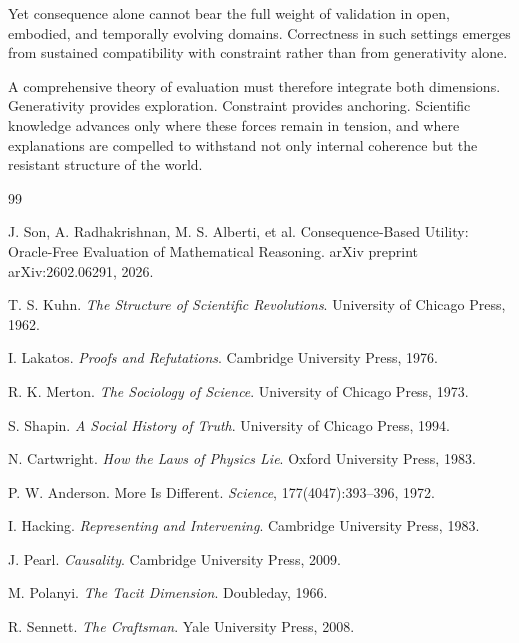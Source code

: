 \documentclass[12pt]{article}
\begin{document}
Yet consequence alone cannot bear the full weight of validation in open, embodied, and temporally evolving domains. Correctness in such settings emerges from sustained compatibility with constraint rather than from generativity alone.

A comprehensive theory of evaluation must therefore integrate both dimensions. Generativity provides exploration. Constraint provides anchoring. Scientific knowledge advances only where these forces remain in tension, and where explanations are compelled to withstand not only internal coherence but the resistant structure of the world.

\newpage
\begin{thebibliography}{99}

J. Son, A. Radhakrishnan, M. S. Alberti, et al.
\newblock Consequence-Based Utility: Oracle-Free Evaluation of Mathematical Reasoning.
\newblock arXiv preprint arXiv:2602.06291, 2026.

T. S. Kuhn.
\newblock \emph{The Structure of Scientific Revolutions}.
\newblock University of Chicago Press, 1962.

I. Lakatos.
\newblock \emph{Proofs and Refutations}.
\newblock Cambridge University Press, 1976.

R. K. Merton.
\newblock \emph{The Sociology of Science}.
\newblock University of Chicago Press, 1973.

S. Shapin.
\newblock \emph{A Social History of Truth}.
\newblock University of Chicago Press, 1994.

N. Cartwright.
\newblock \emph{How the Laws of Physics Lie}.
\newblock Oxford University Press, 1983.

P. W. Anderson.
\newblock More Is Different.
\newblock \emph{Science}, 177(4047):393--396, 1972.

I. Hacking.
\newblock \emph{Representing and Intervening}.
\newblock Cambridge University Press, 1983.

J. Pearl.
\newblock \emph{Causality}.
\newblock Cambridge University Press, 2009.

M. Polanyi.
\newblock \emph{The Tacit Dimension}.
\newblock Doubleday, 1966.

R. Sennett.
\newblock \emph{The Craftsman}.
\newblock Yale University Press, 2008.


\end{thebibliography}
\end{document}
